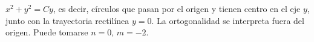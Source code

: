 $x^2+y^2=Cy$, es decir, círculos que pasan por el origen y tienen centro en el eje $y$, junto con la trayectoria rectilínea $y=0$. La ortogonalidad se interpreta fuera del origen. Puede tomarse $n=0$, $m=-2$.
